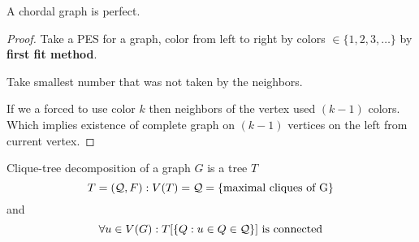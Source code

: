 \begin{theorem}
	A chordal graph is perfect.
\end{theorem}
\begin{proof}
	Take a PES for a graph, color from left to right by colors $ \in \{ 1, 2, 3, \ldots \}$ by \textbf{first fit method}.

	Take smallest number that was not taken by the neighbors.

	If we a forced to use color $k$ then neighbors of the vertex used $(k - 1)$ colors.
	Which implies existence of complete graph on $(k - 1)$ vertices on the left from current vertex.
\end{proof}

\begin{definition}
	Clique-tree decomposition of a graph $G$ is a tree $T$
	\[ T = (\operatorname{\mathcal{Q}}, F): V(T) = \operatorname{\mathcal{Q}} = \{\text{maximal cliques of G} \} \]
	and
	\[ \forall u \in V(G): T[ \{Q: u \in Q \in \operatorname{\mathcal{Q}} \}] \text{ is connected} \]
\end{definition}

